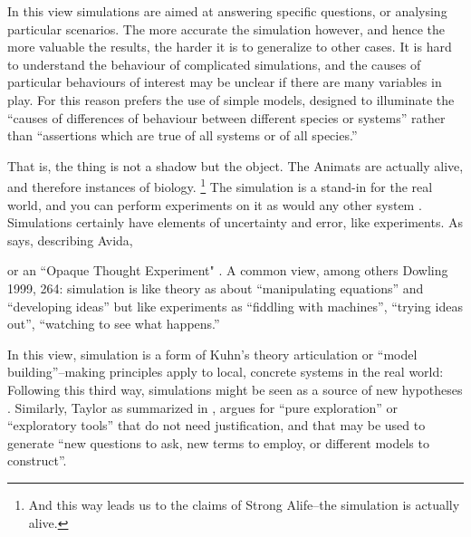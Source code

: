 In this view simulations are aimed at answering specific questions, or analysing particular scenarios. The more accurate the simulation however, and hence the more valuable the results, the harder it is to generalize to other cases. It is hard to understand the behaviour of complicated simulations, and the causes of particular behaviours of interest may be unclear if there are many variables in play. For this reason \parencite{MaynardSmith1974} prefers the use of simple models, designed to illuminate the ``causes of differences of behaviour between different species or systems'' rather than ``assertions which are true of all systems or of all species.''


That is, the thing is not a shadow but the object. The Animats are actually alive, and therefore instances of biology.
\footnote{And this way leads us to the claims of Strong Alife--the simulation is actually alive.}
The simulation is a stand-in for the real world, and you can perform experiments on it as would any other system \parencite[31]{Winsberg2010}. Simulations certainly have elements of uncertainty and error, like experiments. As \parencite{Adami2002} says, describing Avida, 


\parencite[31]{Winsberg2010} or an ``Opaque Thought Experiment" \parencite{DiPaolo2000}. A common view, among others Dowling 1999, 264: simulation is like theory as about ``manipulating equations'' and ``developing ideas'' but like experiments as ``fiddling with machines'', ``trying ideas out'', ``watching to see what happens.'' 

In this view, simulation is a form of Kuhn's theory articulation or ``model building''--making principles apply to local, concrete systems in the real world:  Following this third way, simulations might be seen as a source of new hypotheses \parencite{Eldridge}. Similarly, Taylor as summarized in \parencite{Webb2009}, argues for ``pure exploration'' or ``exploratory tools'' that do not need justification, and that may be used to generate ``new questions to ask, new terms to employ, or different models to construct''.


